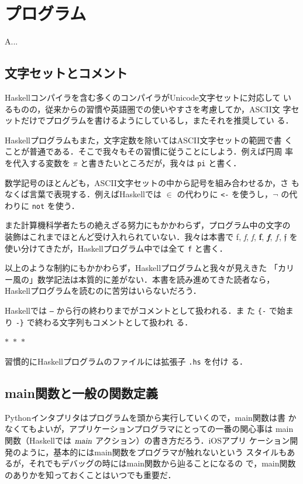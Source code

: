 \documentclass[a5paper,twoside,fleqn,draft]{jsbook}
\newcommand{\separator}{\begin{center}$*$~$*$~$*$\end{center}}
\newcommand{\programminglanguage}[1]{\textsf{#1}}
\newcommand{\haskell}{\programminglanguage{Haskell}}
\newcommand{\python}{\programminglanguage{Python}}
\newenvironment{leader}{\begingroup\gt}{\endgroup}
\newcommand{\code}[1]{\texttt{#1}}
\newcommand{\filename}[1]{\texttt{#1}}
\newcommand{\mAction}[1]{\textsl{#1}}
\DeclareMathOperator{\mMain}{\mAction{main}}
\DeclareMathOperator{\mFrom}{\in}
\begin{document}
\chapter{プログラム}
\label{ch:program}

\begin{leader}
A...
\end{leader}

\section{文字セットとコメント}

\haskell コンパイラを含む多くのコンパイラがUnicode文字セットに対応して
いるものの，従来からの習慣や英語圏での使いやすさを考慮してか，ASCII文
字セットだけでプログラムを書けるようにしているし，またそれを推奨してい
る．

\haskell プログラムもまた，文字定数を除いてはASCII文字セットの範囲で書
くことが普通である．そこで我々もその習慣に従うことにしよう．例えば円周
率を代入する変数を $\pi$ と書きたいところだが，我々は \code{pi} と書く．

数学記号のほとんども，ASCII文字セットの中から記号を組み合わせるか，さ
もなくば言葉で表現する．例えば\haskell では $\mFrom$ の代わりに
\code{<-} を使うし，$\neg$ の代わりに \code{not} を使う．

また計算機科学者たちの絶えざる努力にもかかわらず，プログラム中の文字の
装飾はこれまでほとんど受け入れられていない．我々は本書で \textrm{f},
\textit{f}, \textsl{f}, \textbf{f}, \textbf{\textit{f}}, $f$,
$\mathfrak{f}$ を使い分けてきたが，\haskell プログラム中では全て
\code{f} と書く．

以上のような制約にもかかわらず，\haskell プログラムと我々が見えきた
「カリー風の」数学記法は本質的に差がない．本書を読み進めてきた読者なら，
\haskell プログラムを読むのに苦労はいらないだろう．

\haskell では \code{--} から行の終わりまでがコメントとして扱われる．ま
た \code{\{-} で始まり \code{-\}} で終わる文字列もコメントとして扱われ
る．

\separator

習慣的に\haskell プログラムのファイルには拡張子 \filename{.hs} を付け
る．

\section{main関数と一般の関数定義}

\python インタプリタはプログラムを頭から実行していくので，main関数は書
かなくてもよいが，アプリケーションプログラマにとっての一番の関心事は
main関数（\haskell では $\mMain$ アクション）の書き方だろう．iOSアプリ
ケーション開発のように，基本的にはmain関数をプログラマが触れないという
スタイルもあるが，それでもデバッグの時にはmain関数から辿ることになるの
で，main関数のありかを知っておくことはいつでも重要だ．
\end{document}
